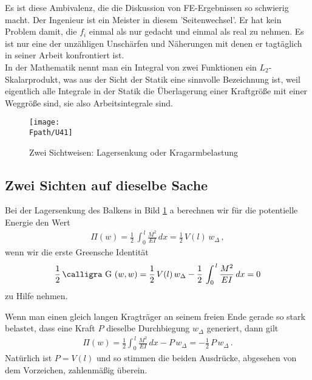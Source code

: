 {{{{Es ist diese Ambivalenz, die die Diskussion von FE-Ergebnissen so schwierig macht. Der Ingenieur ist  ein Meister in diesem 'Seitenwechsel'. Er hat kein Problem damit, die $f_i$ einmal als nur gedacht und einmal als real zu nehmen. Es ist nur eine der unz\"{a}hligen Unsch\"{a}rfen und N\"{a}herungen mit denen er tagt\"{a}glich in seiner Arbeit konfrontiert ist.
\\
In der Mathematik nennt man ein Integral von zwei Funktionen ein $L_2$-Skalarprodukt, was aus der Sicht der Statik eine sinnvolle Bezeichnung ist, weil eigentlich alle Integrale in der Statik die \"{U}berlagerung einer Kraftgr\"{o}{\ss}e mit einer Weggr\"{o}{\ss}e sind, sie also Arbeitsintegrale sind.

\begin{figure}[tbp]
\centering
\if {} \sidecaption \fi
\texttt{[image: \\Fpath/U41]}
\caption{Zwei Sichtweisen: Lagersenkung oder Kragarmbelastung}
\label{U41}
\end{figure}%

{\textcolor{blau2}{\subsection{Zwei Sichten auf dieselbe Sache}}}
Bei der Lagersenkung des Balkens in Bild \ref{U41} a berechnen wir f\"{u}r die potentielle Energie den Wert
\begin{align}
\Pi(w)= \frac{1}{2}\,\int_0^{\,l} \frac{M^2}{EI}\,dx = \frac{1}{2}\,V(l)\,w_\Delta\,,
\end{align}
wenn wir die erste Greensche Identit\"{a}t
\begin{align}
\frac{1}{2}\,\text{\normalfont\calligra G\,\,}(w,w) = \frac{1}{2}\,V(l)\,w_\Delta - \frac{1}{2}\,\int_0^{\,l} \frac{M^2}{EI}\,dx = 0
\end{align}
zu Hilfe nehmen.

Wenn man einen gleich langen Kragtr\"{a}ger an seinem freien Ende gerade so stark belastet, dass eine Kraft $P$ dieselbe Durchbiegung $w_\Delta$ generiert, dann gilt
\begin{align}
\Pi(w) = \frac{1}{2}\int_0^{\,l} \frac{M^2}{EI}\,dx - P\,w_\Delta = - \frac{1}{2}\, P\,w_\Delta \,.
\end{align}
Nat\"{u}rlich ist $P = V(l)$ und so stimmen die beiden Ausdr\"{u}cke, abgesehen von dem Vorzeichen, zahlenm\"{a}{\ss}ig \"{u}berein.

}}}}
